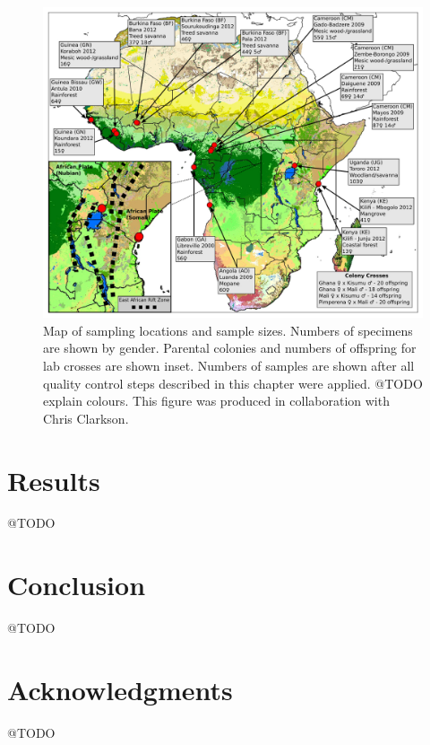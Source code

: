 \documentclass[a4paper,11pt,abstracton,hidelinks]{scrartcl}
\begin{document}
\begin{figure}[t]
\centering
\includegraphics[width=\textwidth]{artwork/chapter3/map.jpeg}
\caption{Map of sampling locations and sample sizes. Numbers of specimens are shown by gender. Parental colonies and numbers of offspring for lab crosses are shown inset. Numbers of samples are shown after all quality control steps described in this chapter were applied. @TODO explain colours. This figure was produced in collaboration with Chris Clarkson.}
\label{fig:map}
\end{figure}


\section{Results}


@TODO


\section{Conclusion}


@TODO


\section{Acknowledgments}


@TODO


\printbibliography
\end{document}
